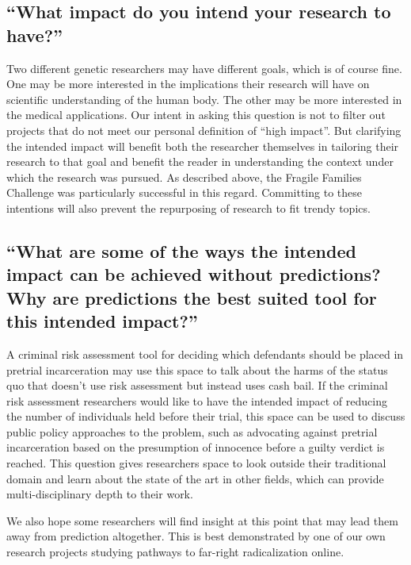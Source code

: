 \documentclass[12pt]{article}
\begin{document}
    \subsection{``What impact do you intend your research to have?''}
    
        Two different genetic researchers may have different goals, which is of course fine. One may be more interested in the implications their research will have on scientific understanding of the human body. The other may be more interested in the medical applications. Our intent in asking this question is not to filter out projects that do not meet our personal definition of ``high impact''. But clarifying the intended impact will benefit both the researcher themselves in tailoring their research to that goal and benefit the reader in understanding the context under which the research was pursued. As described above, the Fragile Families Challenge was particularly successful in this regard. Committing to these intentions will also prevent the repurposing of research to fit trendy topics. 

    \subsection{``What are some of the ways the intended impact can be achieved without predictions? Why are predictions the best suited tool for this intended impact?''}
        
        A criminal risk assessment tool for deciding which defendants should be placed in pretrial incarceration may use this space to talk about the harms of the status quo that doesn't use risk assessment but instead uses cash bail. If the criminal risk assessment researchers would like to have the intended impact of reducing the number of individuals held before their trial, this space can be used to discuss public policy approaches to the problem, such as advocating against pretrial incarceration based on the presumption of innocence before a guilty verdict is reached. This question gives researchers space to look outside their traditional domain and learn about the state of the art in other fields, which can provide multi-disciplinary depth to their work. 
        
        We also hope some researchers will find insight at this point that may lead them away from prediction altogether. This is best demonstrated by one of our own research projects studying pathways to far-right radicalization online. 
\end{document}
